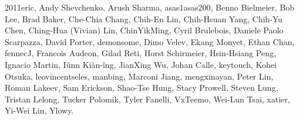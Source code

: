 2011eric,                      %
Andy Shevchenko,               %
Arush Sharma,                  %
asas1asas200,                  %
Benno Bielmeier,               %
Bob Lee,                       %
Brad Baker,                    %
Che-Chia Chang,                %
Chih-En Lin,                   %
Chih-Hsuan Yang,               %
Chih-Yu Chen,                  %
Ching-Hua (Vivian) Lin,        %
ChinYikMing,                   %
Cyril Brulebois,               %
Daniele Paolo Scarpazza,       %
David Porter,                  %
demonsome,                     %
Dimo Velev,                    %
Ekang Monyet,                  %
Ethan Chan,                    %
fennecJ,                       %
Francois Audeon,               %
Gilad Reti,                    %
Horst Schirmeier,              %
Hsin-Hsiang Peng,              %
Ignacio Martin,                %
Iûnn Kiàn-îng,                 %
JianXing Wu,                   %
Johan Calle,                   %
keytouch,                      %
Kohei Otsuka,                  %
leovincentseles,               %
manbing,                       %
Marconi Jiang,                 %
mengxinayan,                   %
Peter Lin,                     %
Roman Lakeev,                  %
Sam Erickson,                  %
Shao-Tse Hung,                 %
Stacy Prowell,                 %
Steven Lung,                   %
Tristan Lelong,                %
Tucker Polomik,                %
Tyler Fanelli,                 %
VxTeemo,                       %
Wei-Lun Tsai,                  %
xatier,                        %
Yi-Wei Lin,                    %
Ylowy.                         %
